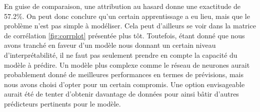 En guise de comparaison, une attribution au hasard donne une exactitude de 57.2\%. On peut donc conclure qu'un certain apprentissage a eu lieu, mais que le problème n'est pas simple à modéliser. Cela peut d'ailleurs se voir dans la matrice de corrélation \ref{fig:corrplot} présentée plus tôt. Toutefois, étant donné que nous avons tranché en faveur d'un modèle nous donnant un certain niveau d'interprétabilité, il ne faut pas seulement prendre en compte la capacité du modèle à prédire. Un modèle plus complexe comme le réseau de neurones aurait probablement donné de meilleures performances en termes de prévisions, mais nous avons choisi d'opter pour un certain compromis. Une option envisageable aurait été de tenter d'obtenir davantage de données pour ainsi bâtir d'autres prédicteurs pertinents pour le modèle.